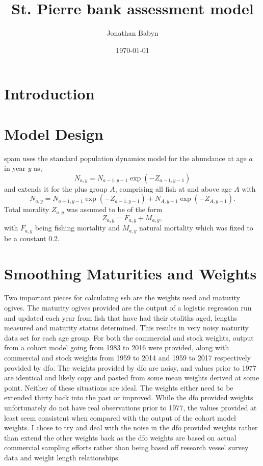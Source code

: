 \documentclass[11pt]{article}\usepackage[]{graphicx}\usepackage[]{color}
\begin{document}
\title{St. Pierre bank assessment model}
\author{Jonathan Babyn}
\date{\today}
\maketitle

\tableofcontents
\newpage

\printnomenclature

\section{Introduction}

\section{Model Design}

\acrshort{spam} uses the standard population dynamics model for the abundance at age $a$ in year $y$ as,
\begin{equation}\label{abun}
  N_{a,y} = N_{a-1,y-1}\exp(-Z_{a-1,y-1})
\end{equation}
and extends it for the plus group $A$, comprising all fish at and above age $A$ with
\begin{equation}\label{abunPlus}
	N_{a,y} = N_{a-1,y-1}\exp(-Z_{a-1,y-1}) + N_{A,y-1}\exp(-Z_{A,y-1}).	
\end{equation}
Total morality $Z_{a,y}$ was assumed to be of the form
\begin{equation}
Z_{a,y} = F_{a,y} + M_{a,y},	
\end{equation}
with $F_{a,y}$ being fishing mortality and $M_{a,y}$ natural mortality which was fixed to be a constant 0.2.
\section{Smoothing Maturities and Weights}

Two important pieces for calculating \acrshort{ssb} are the weights used and maturity ogives. The maturity ogives provided are the output of a logistic regression run and updated each year from fish that have had their otoliths aged, lengths measured and maturity status determined. This results in very noisy maturity data set for each age group. For both the commercial and stock weights, output from a cohort model going from 1983 to 2016 were provided, along with commercial and stock weights from 1959 to 2014 and 1959 to 2017 respectively provided by \acrshort{dfo}. The weights provided by \acrshort{dfo} are noisy, and values prior to 1977 are identical and likely copy and pasted from some mean weights derived at some point. Neither of these situations are ideal. The weights either need to be extended thirty back into the past or improved. While the \acrshort{dfo} provided weights unfortunately do not have real observations prior to 1977, the values provided at least seem consistent when compared with the output of the cohort model weights. I chose to try and deal with the noise in the \acrshort{dfo} provided weights rather than extend the other weights back as the \acrshort{dfo} weights are based on actual commercial sampling efforts rather than being based off research vessel survey data and weight length relationships.
\end{document}
